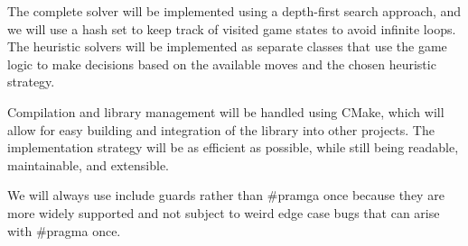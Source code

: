 \documentclass[11pt]{article}
\begin{document}
The complete solver will be implemented using a depth-first search approach, and we will use a hash set to keep track of visited game states to avoid infinite loops.
The heuristic solvers will be implemented as separate classes that use the game logic to make decisions based on the available moves and the chosen heuristic strategy.

Compilation and library management will be handled using CMake, which will allow for easy building and integration of the library into other projects.
The implementation strategy will be as efficient as possible, while still being readable, maintainable, and extensible.

We will always use include guards rather than #pramga once because they are more widely supported and not subject to weird edge case bugs that can arise with #pragma once.
\end{document}
